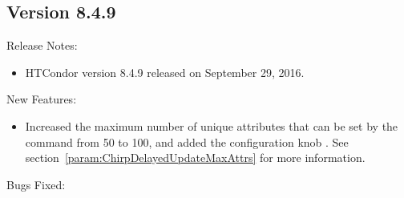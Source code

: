 \subsection*{\label{sec:New-8-4-9}Version 8.4.9}

\noindent Release Notes:

\begin{itemize}

\item HTCondor version 8.4.9 released on September 29, 2016.

\end{itemize}


\noindent New Features:

\begin{itemize}

\item Increased the maximum number of unique attributes that can be 
set by the  command  from
50 to 100, and added the configuration knob .
See section~\ref{param:ChirpDelayedUpdateMaxAttrs} for more information.

\end{itemize}

\noindent Bugs Fixed:


